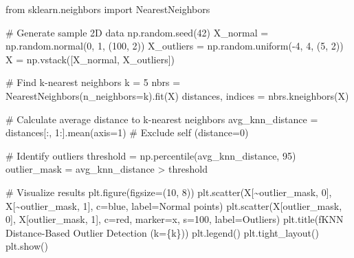 \documentclass[
  letterpaper,
  DIV=11,
  numbers=noendperiod]{scrreprt}
\newenvironment{Shaded}{\begin{snugshade}}{\end{snugshade}}
\newcommand{\CommentTok}[1]{\textcolor[rgb]{0.37,0.37,0.37}{#1}}
\newcommand{\DecValTok}[1]{\textcolor[rgb]{0.68,0.00,0.00}{#1}}
\newcommand{\ImportTok}[1]{\textcolor[rgb]{0.00,0.46,0.62}{#1}}
\newcommand{\NormalTok}[1]{\textcolor[rgb]{0.00,0.23,0.31}{#1}}
\newcommand{\OperatorTok}[1]{\textcolor[rgb]{0.37,0.37,0.37}{#1}}
\newcommand{\SpecialCharTok}[1]{\textcolor[rgb]{0.37,0.37,0.37}{#1}}
\newcommand{\SpecialStringTok}[1]{\textcolor[rgb]{0.13,0.47,0.30}{#1}}
\newcommand{\StringTok}[1]{\textcolor[rgb]{0.13,0.47,0.30}{#1}}
\begin{document}
\begin{Shaded}
\begin{Highlighting}[]
\ImportTok{from}\NormalTok{ sklearn.neighbors }\ImportTok{import}\NormalTok{ NearestNeighbors}

\CommentTok{\# Generate sample 2D data}
\NormalTok{np.random.seed(}\DecValTok{42}\NormalTok{)}
\NormalTok{X\_normal }\OperatorTok{=}\NormalTok{ np.random.normal(}\DecValTok{0}\NormalTok{, }\DecValTok{1}\NormalTok{, (}\DecValTok{100}\NormalTok{, }\DecValTok{2}\NormalTok{))}
\NormalTok{X\_outliers }\OperatorTok{=}\NormalTok{ np.random.uniform(}\OperatorTok{{-}}\DecValTok{4}\NormalTok{, }\DecValTok{4}\NormalTok{, (}\DecValTok{5}\NormalTok{, }\DecValTok{2}\NormalTok{))}
\NormalTok{X }\OperatorTok{=}\NormalTok{ np.vstack([X\_normal, X\_outliers])}

\CommentTok{\# Find k{-}nearest neighbors}
\NormalTok{k }\OperatorTok{=} \DecValTok{5}
\NormalTok{nbrs }\OperatorTok{=}\NormalTok{ NearestNeighbors(n\_neighbors}\OperatorTok{=}\NormalTok{k).fit(X)}
\NormalTok{distances, indices }\OperatorTok{=}\NormalTok{ nbrs.kneighbors(X)}

\CommentTok{\# Calculate average distance to k{-}nearest neighbors}
\NormalTok{avg\_knn\_distance }\OperatorTok{=}\NormalTok{ distances[:, }\DecValTok{1}\NormalTok{:].mean(axis}\OperatorTok{=}\DecValTok{1}\NormalTok{)  }\CommentTok{\# Exclude self (distance=0)}

\CommentTok{\# Identify outliers}
\NormalTok{threshold }\OperatorTok{=}\NormalTok{ np.percentile(avg\_knn\_distance, }\DecValTok{95}\NormalTok{)}
\NormalTok{outlier\_mask }\OperatorTok{=}\NormalTok{ avg\_knn\_distance }\OperatorTok{\textgreater{}}\NormalTok{ threshold}

\CommentTok{\# Visualize results}
\NormalTok{plt.figure(figsize}\OperatorTok{=}\NormalTok{(}\DecValTok{10}\NormalTok{, }\DecValTok{8}\NormalTok{))}
\NormalTok{plt.scatter(X[}\OperatorTok{\textasciitilde{}}\NormalTok{outlier\_mask, }\DecValTok{0}\NormalTok{], X[}\OperatorTok{\textasciitilde{}}\NormalTok{outlier\_mask, }\DecValTok{1}\NormalTok{], c}\OperatorTok{=}\StringTok{\textquotesingle{}blue\textquotesingle{}}\NormalTok{, label}\OperatorTok{=}\StringTok{\textquotesingle{}Normal points\textquotesingle{}}\NormalTok{)}
\NormalTok{plt.scatter(X[outlier\_mask, }\DecValTok{0}\NormalTok{], X[outlier\_mask, }\DecValTok{1}\NormalTok{], c}\OperatorTok{=}\StringTok{\textquotesingle{}red\textquotesingle{}}\NormalTok{, marker}\OperatorTok{=}\StringTok{\textquotesingle{}x\textquotesingle{}}\NormalTok{, s}\OperatorTok{=}\DecValTok{100}\NormalTok{, label}\OperatorTok{=}\StringTok{\textquotesingle{}Outliers\textquotesingle{}}\NormalTok{)}
\NormalTok{plt.title(}\SpecialStringTok{f\textquotesingle{}KNN Distance{-}Based Outlier Detection (k=}\SpecialCharTok{\{}\NormalTok{k}\SpecialCharTok{\}}\SpecialStringTok{)\textquotesingle{}}\NormalTok{)}
\NormalTok{plt.legend()}
\NormalTok{plt.tight\_layout()}
\NormalTok{plt.show()}
\end{Highlighting}
\end{Shaded}
\end{document}
